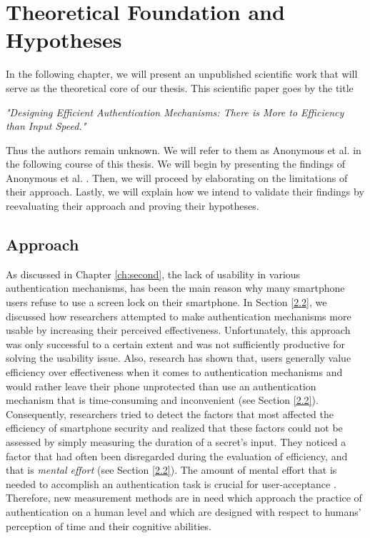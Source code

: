 
\chapter{Theoretical Foundation and Hypotheses}\label{ch:third}

In the following chapter, we will present an unpublished scientific work that will serve as the theoretical core of our thesis. This scientific paper goes by the title 
\begin{center}
 \textit{"Designing Efficient Authentication Mechanisms: There is More to Efficiency than Input Speed."}   
\end{center}
Thus the authors remain unknown. We will refer to them as Anonymous et al. \cite{anonymous} in the following course of this thesis. We will begin by presenting the findings of Anonymous et al. \cite{anonymous}. Then, we will proceed by elaborating on the limitations of their approach. Lastly, we will explain how we intend to validate their findings by reevaluating their approach and proving their hypotheses.

\section{Approach}

As discussed in Chapter \ref{ch:second}, the lack of usability in various authentication mechanisms, has been the main reason why many smartphone users refuse to use a screen lock on their smartphone. In Section \ref{2.2}, we discussed how researchers attempted to make authentication mechanisms more usable by increasing their perceived effectiveness. Unfortunately, this approach was only successful to a certain extent and was not sufficiently productive for solving the usability issue. Also, research has shown that, users generally value efficiency over effectiveness when it comes to authentication mechanisms and would rather leave their phone unprotected than use an authentication mechanism that is time-consuming and inconvenient (see Section \ref{2.2}). Consequently, researchers tried to detect the factors that most affected the efficiency of smartphone security and realized that these factors could not be assessed by simply measuring the duration of a secret's input. They noticed a factor that had often been disregarded during the evaluation of efficiency, and that is \textit{mental effort} (see Section \ref{2.2}). The amount of mental effort that is needed to accomplish an authentication task is crucial for user-acceptance \cite{anonymous}. Therefore, new measurement methods are in need which approach the practice of authentication on a human level and which are designed with respect to humans' perception of time and their cognitive abilities. \\



